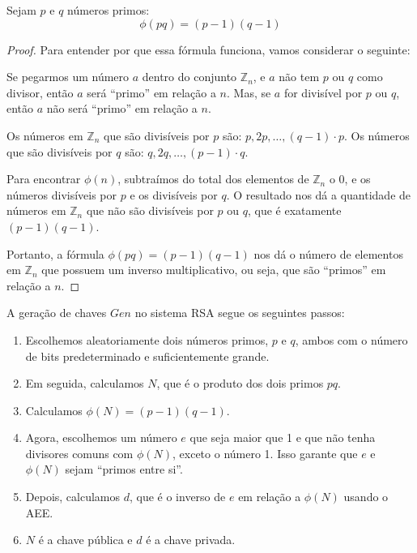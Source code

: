 \begin{proposition}
Sejam $p$ e $q$ números primos:
\begin{displaymath}
  \phi(pq) = (p - 1)(q - 1)
\end{displaymath}
\end{proposition}
\begin{proof}
Para entender por que essa fórmula funciona, vamos considerar o seguinte:

Se pegarmos um número $a$ dentro do conjunto $\mathbb{Z}_n$, e $a$ não tem $p$ ou $q$ como divisor, então $a$ será ``primo'' em relação a $n$.
Mas, se $a$ for divisível por $p$ ou $q$, então $a$ não será ``primo'' em relação a $n$.

Os números em $\mathbb{Z}_n$ que são divisíveis por $p$ são: $p, 2p, \dots, (q-1) \cdot p$.
Os números que são divisíveis por $q$ são: $q, 2q, \dots, (p-1) \cdot q$.

Para encontrar $\phi(n)$, subtraímos do total dos elementos de $\mathbb{Z}_n$ o $0$, e os números divisíveis por $p$ e os divisíveis por $q$.
O resultado nos dá a quantidade de números em $\mathbb{Z}_n$ que não são divisíveis por $p$ ou $q$, que é exatamente $(p-1)(q-1)$.

Portanto, a fórmula $\phi(pq) = (p-1)(q-1)$ nos dá o número de elementos em $\mathbb{Z}_n$ que possuem um inverso multiplicativo, ou seja, que são ``primos'' em relação a $n$.
\end{proof}

A geração de chaves $Gen$ no sistema RSA segue os seguintes passos:

\begin{enumerate}
\item Escolhemos aleatoriamente dois números primos, $p$ e $q$, ambos com o número de bits predeterminado e suficientemente grande.
    
\item Em seguida, calculamos $N$, que é o produto dos dois primos $pq$.
\item Calculamos $\phi(N) = (p - 1)(q - 1)$. 
    
\item Agora, escolhemos um número $e$ que seja maior que 1 e que não tenha divisores comuns com $\phi(N)$, exceto o número 1.
  Isso garante que $e$ e $\phi(N)$ sejam ``primos entre si''.
    
\item Depois, calculamos $d$, que é o inverso de $e$ em relação a $\phi(N)$ usando o AEE.
\item $N$ é a chave pública e $d$ é a chave privada.
\end{enumerate}

